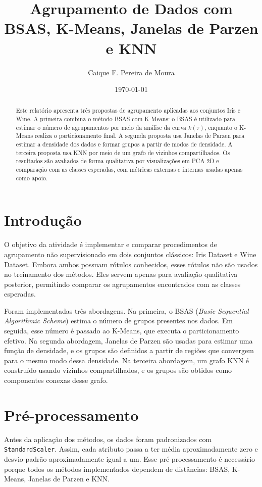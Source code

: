 \documentclass[12pt,a4paper]{article}
\title{Agrupamento de Dados com BSAS, K-Means, Janelas de Parzen e KNN}
\author{Caique F. Pereira de Moura}
\date{\today}
\begin{document}
\maketitle

\begin{abstract}
Este relatório apresenta três propostas de agrupamento aplicadas aos conjuntos
Iris e Wine. A primeira combina o método BSAS com K-Means: o BSAS é utilizado
para estimar o número de agrupamentos por meio da análise da curva
$k(\tau)$, enquanto o K-Means realiza o particionamento final. A segunda
proposta usa Janelas de Parzen para estimar a densidade dos dados e formar
grupos a partir de modos de densidade. A terceira proposta usa KNN por meio de
um grafo de vizinhos compartilhados. Os resultados são avaliados de forma
qualitativa por visualizações em PCA 2D e comparação com as classes esperadas,
com métricas externas e internas usadas apenas como apoio.
\end{abstract}

\section{Introdução}

O objetivo da atividade é implementar e comparar procedimentos de agrupamento
não supervisionado em dois conjuntos clássicos: Iris Dataset e Wine Dataset.
Embora ambos possuam rótulos conhecidos, esses rótulos não são usados no
treinamento dos métodos. Eles servem apenas para avaliação qualitativa posterior,
permitindo comparar os agrupamentos encontrados com as classes esperadas.

Foram implementadas três abordagens. Na primeira, o BSAS
(\textit{Basic Sequential Algorithmic Scheme}) estima o número de grupos
presentes nos dados. Em seguida, esse número é passado ao K-Means, que executa o
particionamento efetivo. Na segunda abordagem, Janelas de Parzen são usadas para
estimar uma função de densidade, e os grupos são definidos a partir de regiões
que convergem para o mesmo modo dessa densidade. Na terceira abordagem, um grafo
KNN é construído usando vizinhos compartilhados, e os grupos são obtidos como
componentes conexas desse grafo.

\section{Pré-processamento}

Antes da aplicação dos métodos, os dados foram padronizados com
\texttt{StandardScaler}. Assim, cada atributo passa a ter média aproximadamente
zero e desvio-padrão aproximadamente igual a um. Esse pré-processamento é
necessário porque todos os métodos implementados dependem de distâncias:
BSAS, K-Means, Janelas de Parzen e KNN.
\end{document}
